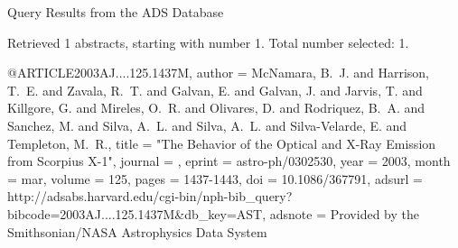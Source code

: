 Query Results from the ADS Database


Retrieved 1 abstracts, starting with number 1.  Total number selected: 1.

@ARTICLE{2003AJ....125.1437M,
   author = {{McNamara}, B.~J. and {Harrison}, T.~E. and {Zavala}, R.~T. and 
	{Galvan}, E. and {Galvan}, J. and {Jarvis}, T. and {Killgore}, G. and 
	{Mireles}, O.~R. and {Olivares}, D. and {Rodriquez}, B.~A. and 
	{Sanchez}, M. and {Silva}, A.~L. and {Silva}, A.~L. and {Silva-Velarde}, E. and 
	{Templeton}, M.~R.},
    title = "{The Behavior of the Optical and X-Ray Emission from Scorpius X-1}",
  journal = {\aj},
   eprint = {astro-ph/0302530},
     year = 2003,
    month = mar,
   volume = 125,
    pages = {1437-1443},
      doi = {10.1086/367791},
   adsurl = {http://adsabs.harvard.edu/cgi-bin/nph-bib_query?bibcode=2003AJ....125.1437M&db_key=AST},
  adsnote = {Provided by the Smithsonian/NASA Astrophysics Data System}
}


